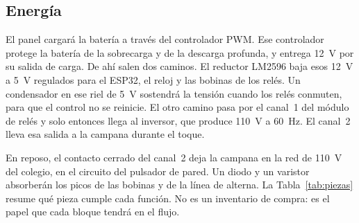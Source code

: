 \documentclass[12pt,letterpaper]{article}
\begin{document}
\subsection*{Energía}

El panel cargará la batería a través del controlador PWM. Ese controlador protege la batería de la sobrecarga y de la descarga profunda, y entrega 12~V por su salida de carga. De ahí salen dos caminos. El reductor LM2596 baja esos 12~V a 5~V regulados para el ESP32, el reloj y las bobinas de los relés. Un condensador en ese riel de 5~V sostendrá la tensión cuando los relés conmuten, para que el control no se reinicie. El otro camino pasa por el canal~1 del módulo de relés y solo entonces llega al inversor, que produce 110~V a 60~Hz. El canal~2 lleva esa salida a la campana durante el toque.

En reposo, el contacto cerrado del canal~2 deja la campana en la red de 110~V del colegio, en el circuito del pulsador de pared. Un diodo y un varistor absorberán los picos de las bobinas y de la línea de alterna. La Tabla~\ref{tab:piezas} resume qué pieza cumple cada función. No es un inventario de compra: es el papel que cada bloque tendrá en el flujo.
\end{document}
